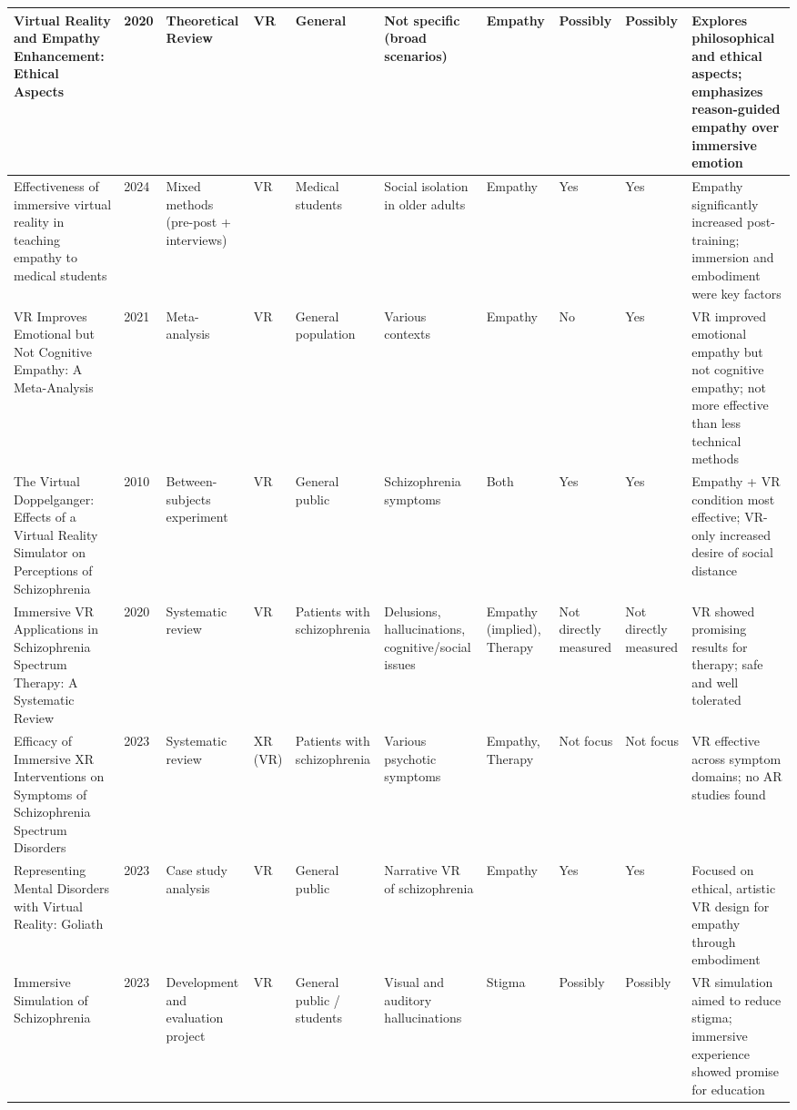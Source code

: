 \begin{landscape}
\begin{longtable}{|P{2.8cm}|P{0.6cm}|P{1.8cm}|P{1.2cm}|P{1.2cm}|P{2cm}|P{1.2cm}|P{1.2cm}|P{1.2cm}|P{3cm}|}
    \hline
    Virtual Reality and Empathy Enhancement: Ethical Aspects & 2020 & Theoretical Review & VR & General & Not specific (broad scenarios) & Empathy & Possibly & Possibly & Explores philosophical and ethical aspects; emphasizes reason-guided empathy over immersive emotion \\
    \hline
    Effectiveness of immersive virtual reality in teaching empathy to medical students & 2024 & Mixed methods (pre-post + interviews) & VR & Medical students & Social isolation in older adults & Empathy & Yes & Yes & Empathy significantly increased post-training; immersion and embodiment were key factors \\
    \hline
    VR Improves Emotional but Not Cognitive Empathy: A Meta-Analysis & 2021 & Meta-analysis & VR & General population & Various contexts & Empathy & No & Yes & VR improved emotional empathy but not cognitive empathy; not more effective than less technical methods \\
    \hline
    The Virtual Doppelganger: Effects of a Virtual Reality Simulator on Perceptions of Schizophrenia & 2010 & Between-subjects experiment & VR & General public & Schizophrenia symptoms & Both & Yes & Yes & Empathy + VR condition most effective; VR-only increased desire of social distance \\
    \hline
    Immersive VR Applications in Schizophrenia Spectrum Therapy: A Systematic Review & 2020 & Systematic review & VR & Patients with schizophrenia  & Delusions, hallucinations, cognitive/social issues & Empathy (implied), Therapy & Not directly measured & Not directly measured & VR showed promising results for therapy; safe and well tolerated \\
    \hline
    Efficacy of Immersive XR Interventions on Symptoms of Schizophrenia Spectrum Disorders & 2023 & Systematic review & XR (VR) & Patients with schizophrenia & Various psychotic symptoms & Empathy, Therapy & Not focus & Not focus & VR effective across symptom domains; no AR studies found \\
    \hline
    Representing Mental Disorders with Virtual Reality: Goliath & 2023 & Case study analysis & VR & General public & Narrative VR of schizophrenia & Empathy & Yes & Yes & Focused on ethical, artistic VR design for empathy through embodiment \\
    \hline
    Immersive Simulation of Schizophrenia & 2023 & Development and evaluation project & VR & General public / students & Visual and auditory hallucinations & Stigma & Possibly & Possibly & VR simulation aimed to reduce stigma; immersive experience showed promise for education \\

\end{longtable}
\end{landscape}
